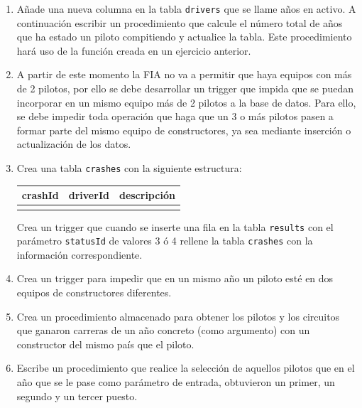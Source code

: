 \documentclass[a4paper]{article}
\begin{document}
\begin{enumerate}
    \item Añade una nueva columna en la tabla \texttt{drivers} que se llame años en activo. A continuación escribir un procedimiento que calcule el número total de años que ha estado un piloto compitiendo y actualice la tabla. Este procedimiento hará uso de la función creada en un ejercicio anterior.
    
    \item A partir de este momento la FIA no va a permitir que haya equipos con más de 2 pilotos, por ello se debe desarrollar un trigger que impida que se puedan incorporar en un mismo equipo más de 2 pilotos a la base de datos. Para ello, se debe impedir toda operación que haga que un 3 o más pilotos pasen a formar parte del mismo equipo de constructores, ya sea mediante inserción o actualización de los datos. 
            
    \item Crea una tabla \texttt{crashes} con la siguiente estructura:
    \begin{table}[h]
    \centering
    \begin{tabular}{@{}lll@{}}
    \toprule
    \multicolumn{1}{c}{\textbf{crashId}} & \multicolumn{1}{c}{\textbf{driverId}} & \multicolumn{1}{c}{\textbf{descripción}} \\ \midrule
                                          &                                      &                                          \\ \bottomrule
    \end{tabular}
    \end{table}

    Crea un trigger que cuando se inserte una fila en la tabla \texttt{results} con el parámetro \texttt{statusId} de valores 3 ó 4 rellene la tabla \texttt{crashes} con la información correspondiente.

    \item Crea un trigger para impedir que en un mismo año un piloto esté en dos equipos de constructores diferentes.
         
    \item Crea un procedimiento almacenado para obtener los pilotos y los circuitos que ganaron carreras de un año concreto (como argumento) con un constructor del mismo país que el piloto.

    \item Escribe un procedimiento que realice la selección de aquellos pilotos que en el año que se le pase como parámetro de entrada, obtuvieron un primer, un segundo y un tercer puesto.
        

\end{enumerate}
\end{document}
